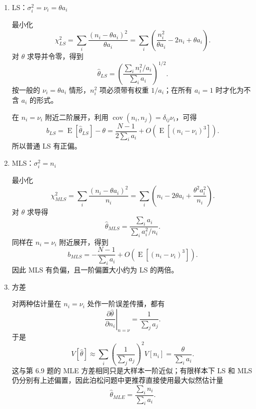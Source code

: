 \begin{question}
\begin{solution}
\begin{enumerate}
\item LS：\(\sigma_i^2=\nu_i=\theta a_i\)

最小化
\[
\chi^2_{LS}=\sum_i\frac{(n_i-\theta a_i)^2}{\theta a_i}
=\sum_i\left(\frac{n_i^2}{\theta a_i}-2n_i+\theta a_i\right).
\]
对 \(\theta\) 求导并令零，得到
\[
\hat\theta_{LS}
=\left(\frac{\sum_i n_i^2/a_i}{\sum_i a_i}\right)^{1/2}.
\]
按一般的 \(\nu_i=\theta a_i\) 情形，\(n_i^2\) 项必须带有权重 \(1/a_i\)；在所有 \(a_i=1\) 时才化为不含 \(a_i\) 的形式。

在 \(n_i=\nu_i\) 附近二阶展开，利用
\(\operatorname{cov}(n_i,n_j)=\delta_{ij}\nu_i\)，可得
\[
b_{LS}=\operatorname{E}[\hat\theta_{LS}]-\theta
=\frac{N-1}{2\sum_i a_i}+O(\operatorname{E}[(n_i-\nu_i)^3]).
\]
所以普通 LS 有正偏。

\item MLS：\(\sigma_i^2=n_i\)

最小化
\[
\chi^2_{MLS}=\sum_i\frac{(n_i-\theta a_i)^2}{n_i}
=\sum_i\left(n_i-2\theta a_i+\frac{\theta^2a_i^2}{n_i}\right).
\]
对 \(\theta\) 求导得
\[
\hat\theta_{MLS}
=\frac{\sum_i a_i}{\sum_i a_i^2/n_i}.
\]
同样在 \(n_i=\nu_i\) 附近展开，得到
\[
b_{MLS}
= -\frac{N-1}{\sum_i a_i}+O(\operatorname{E}[(n_i-\nu_i)^3]).
\]
因此 MLS 有负偏，且一阶偏置大小约为 LS 的两倍。

\item 方差

对两种估计量在 \(n_i=\nu_i\) 处作一阶误差传播，都有
\[
\left.\frac{\partial\hat\theta}{\partial n_i}\right|_{n=\nu}
=\frac1{\sum_j a_j}.
\]
于是
\[
V[\hat\theta]
\approx\sum_i\left(\frac1{\sum_j a_j}\right)^2V[n_i]
=\frac{\theta}{\sum_i a_i}.
\]
这与第 6.9 题的 MLE 方差相同只是大样本一阶近似；有限样本下 LS 和 MLS 仍分别有上述偏置，因此泊松问题中更推荐直接使用最大似然估计量
\[
\hat\theta_{MLE}=\frac{\sum_i n_i}{\sum_i a_i}.
\]
\end{enumerate}
\end{solution}
\end{question}


